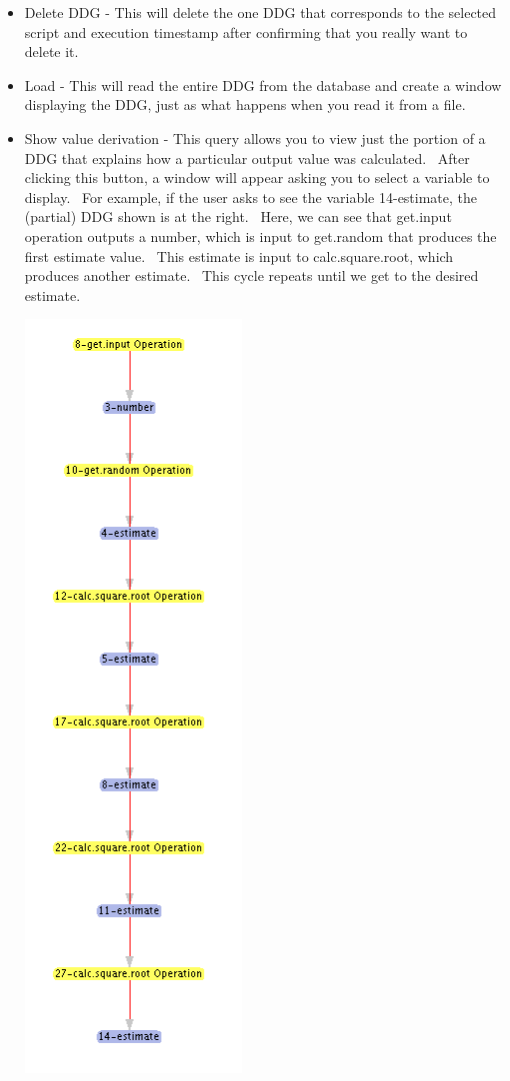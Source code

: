 \documentclass[letterpaper]{article}
\newcommand\liststyleWWviiiNumii{%
\renewcommand\labelitemi{•}
\renewcommand\labelitemii{•}
\renewcommand\labelitemiii{•}
\renewcommand\labelitemiv{•}
}
\begin{document}
\liststyleWWviiiNumii
\begin{itemize}
\item {\color{black}
Delete DDG - This will delete the one DDG that corresponds to the selected script and execution timestamp after confirming that you really want to delete it.}
\item {\color{black}
Load - This will read the entire DDG from the database and create a window displaying the DDG, just as what happens when you read it from a file.}
\item {\color{black}
Show value derivation - This query allows you to view just the portion of a DDG that explains how a particular output value was calculated. \ After clicking this button, a window will appear asking you to select a variable to display. \ For example, if the user asks to see the variable 14-estimate, the (partial) DDG shown is at the right. \ Here, we can see that get.input operation outputs a number, which is input to get.random that produces the first estimate value. \ This estimate is input to calc.square.root, which produces another estimate. \ This cycle repeats until we get to the desired estimate. \ }
\begin{center}
\includegraphics[width=2.2654in,height=7.8472in]{UsingDDGExplorer-img/UsingDDGExplorer-img008.png}
\end{center}
\end{itemize}
\end{document}
